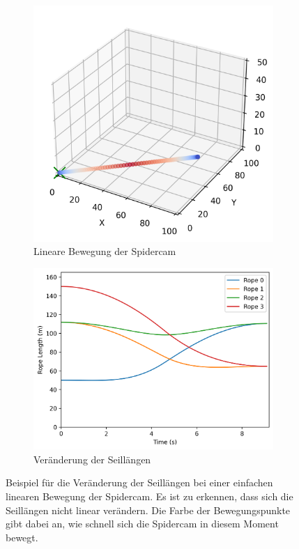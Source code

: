 \begin{figure}[H]
    \centering
    \begin{subfigure}[b]{0.45\textwidth}
        \centering
        \includegraphics[width=\textwidth]{../python/output/test_single_cam_pos.png}
        \caption{Lineare Bewegung der Spidercam}
        \label{fig:length_change}
    \end{subfigure}
    \hfill
    \begin{subfigure}[b]{0.45\textwidth}
        \centering
        \includegraphics[width=\textwidth]{../python/output/test_single_rope_lengths.png}
        \caption{Veränderung der Seillängen}
        \label{fig:length_change_2}
    \end{subfigure}
    \caption{Beispiel für die Veränderung der Seillängen bei einer einfachen linearen Bewegung der Spidercam.
        Es ist zu erkennen, dass sich die Seillängen nicht linear verändern.
        Die Farbe der Bewegungspunkte gibt dabei an, wie schnell sich die Spidercam in diesem Moment bewegt.}
    \label{fig:length_change}
\end{figure}

